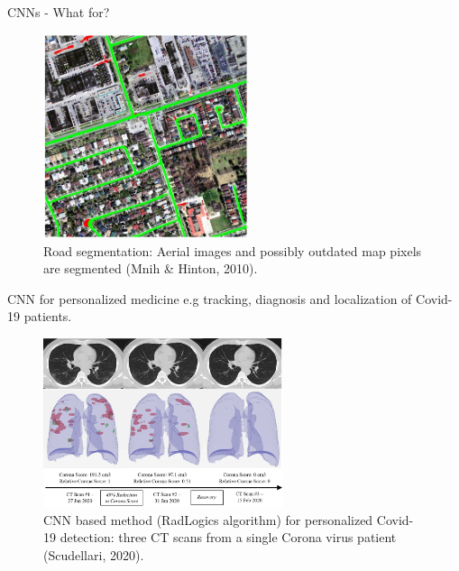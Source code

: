 \begin{vbframe}{CNNs - What for?}
  \begin{figure}
    \centering
    \includegraphics[width=6cm]{figure/road_seg.png}
    \caption{Road segmentation: Aerial images and possibly outdated map pixels are segmented (Mnih \& Hinton, 2010).}
  \end{figure}
\framebreak

% 


CNN for personalized medicine e.g tracking, diagnosis and localization of Covid-19 patients.
\begin{figure}
  \centering
  \includegraphics[width=7cm]{figure/coronatrack.jpeg}
   \caption{CNN based method (RadLogics algorithm) for personalized Covid-19 detection: three CT scans from a single Corona virus patient (Scudellari, 2020).}
\end{figure}
  

\end{vbframe}
